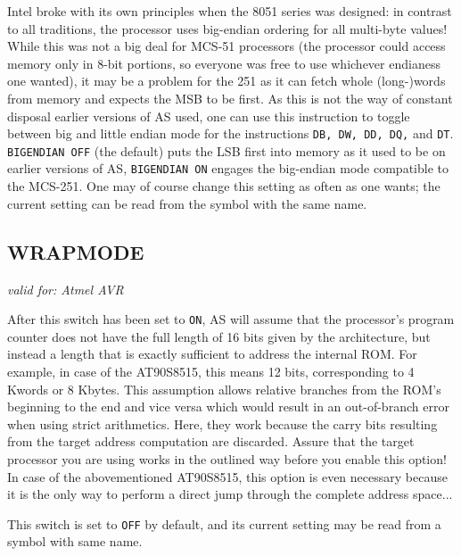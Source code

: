 \documentclass[12pt,twoside]{report}
\makeatletter
\newcommand{\tty}[1]{{\tt #1}}
\newcommand{\ttindex}[1]{\index{#1@{\tt #1}}}
\makeatother
\begin{document}
Intel broke with its own principles when the 8051 series was designed: in
contrast to all traditions, the processor uses big-endian ordering for all
multi-byte values!  While this was not a big deal for MCS-51 processors
(the processor could access memory only in 8-bit portions, so everyone was
free to use whichever endianess one wanted), it may be a problem for the
251 as it can fetch whole (long-)words from memory and expects the MSB to
be first.  As this is not the way of constant disposal earlier versions of
AS used, one can use this instruction to toggle between big and
little endian mode for the instructions \tty{DB, DW, DD, DQ,} and
\tty{DT}.  \tty{BIGENDIAN OFF} (the default) puts the LSB first into
memory as it used to be on earlier versions of AS, \tty{BIGENDIAN ON}
engages the big-endian mode compatible to the MCS-251.  One may of course
change this setting as often as one wants; the current setting can be read
from the symbol with the same name.


\subsection{WRAPMODE}
\ttindex{WRAPMODE}

{\em valid for: Atmel AVR}

After this switch has been set to {\tt ON}, AS will assume that the
processor's program counter does not have the full length of 16 bits given
by the architecture, but instead a length that is exactly sufficient to
address the internal ROM.  For example, in case of the AT90S8515, this
means 12 bits, corresponding to 4 Kwords or 8 Kbytes.  This assumption
allows relative branches from the ROM's beginning to the end and vice
versa which would result in an out-of-branch error when using strict
arithmetics.  Here, they work because the carry bits resulting from the
target address computation are discarded.  Assure that the target
processor you are using works in the outlined way before you enable this
option!  In case of the abovementioned AT90S8515, this option is even
necessary because it is the only way to perform a direct jump through
the complete address space...

This switch is set to {\tt OFF} by default, and its current setting may be
read from a symbol with same name.

\end{document}
